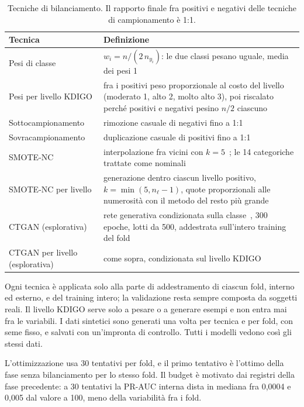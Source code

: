 \documentclass[a4paper, 12pt, oneside]{book}
\begin{document}
\begin{table}[H]
	\centering
	\small
	\caption{Tecniche di bilanciamento. Il rapporto finale fra positivi e negativi delle tecniche di campionamento è 1:1.}
	\label{tab:bilanciamento}
	\begin{tabularx}{\textwidth}{@{}>{\raggedright\arraybackslash}p{3.3cm} >{\raggedright\arraybackslash}X@{}}
		\toprule
		Tecnica & Definizione \\
		\midrule
		Pesi di classe & $w_i = n / (2\, n_{y_i})$: le due classi pesano uguale, media dei pesi 1 \\
		Pesi per livello KDIGO & fra i positivi peso proporzionale al costo del livello (moderato 1, alto 2, molto alto 3), poi riscalato perché positivi e negativi pesino $n/2$ ciascuno \\
		Sottocampionamento & rimozione casuale di negativi fino a 1:1 \\
		Sovracampionamento & duplicazione casuale di positivi fino a 1:1 \\
		SMOTE-NC & interpolazione fra vicini con $k = 5$~\cite{chawla_smote_2002}; le 14 categoriche trattate come nominali \\
		SMOTE-NC per livello & generazione dentro ciascun livello positivo, $k = \min(5, n_\ell - 1)$, quote proporzionali alle numerosità con il metodo del resto più grande \\
		CTGAN (esplorativa) & rete generativa condizionata sulla classe~\cite{xu_modeling_2019}, 300 epoche, lotti da 500, addestrata sull'intero training del fold \\
		CTGAN per livello (esplorativa) & come sopra, condizionata sul livello KDIGO \\
		\bottomrule
	\end{tabularx}
\end{table}

Ogni tecnica è applicata solo alla parte di addestramento di ciascun fold, interno ed esterno, e del training intero; la validazione resta sempre composta da soggetti reali. Il livello KDIGO serve solo a pesare o a generare esempi e non entra mai fra le variabili. I dati sintetici sono generati una volta per tecnica e per fold, con seme fisso, e salvati con un'impronta di controllo. Tutti i modelli vedono così gli stessi dati.

L'ottimizzazione usa 30 tentativi per fold, e il primo tentativo è l'ottimo della fase senza bilanciamento per lo stesso fold. Il budget è motivato dai registri della fase precedente: a 30 tentativi la PR-AUC interna dista in mediana fra 0,0004 e 0,005 dal valore a 100, meno della variabilità fra i fold. 
\end{document}
